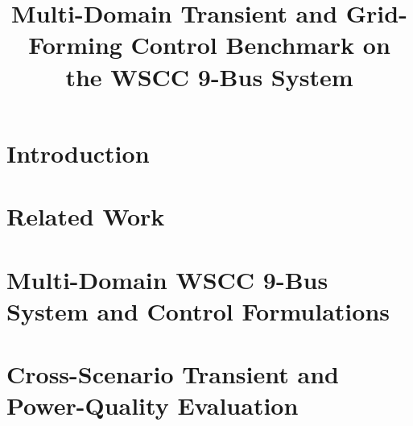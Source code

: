 \documentclass[conference]{IEEEtran}
\begin{document}
\title{Multi-Domain Transient and Grid-Forming Control Benchmark on the WSCC 9-Bus System}

\author{
}

\maketitle

\begin{abstract}
\end{abstract}

\begin{IEEEkeywords}
\end{IEEEkeywords}

\section{Introduction}\label{sec:intro}

\section{Related Work}\label{sec:related}

\section{Multi-Domain WSCC 9-Bus System and Control Formulations}\label{sec:methodology}

\section{Cross-Scenario Transient and Power-Quality Evaluation}\label{sec:experiments}
\end{document}

